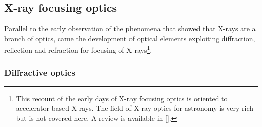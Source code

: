 \begin{refsection}
\subsection{X-ray focusing optics}\label{sec:focusing}

Parallel to the early observation of the phenomena that showed that X-rays are a branch of optics, came the development of optical elements exploiting diffraction, reflection and refraction for focusing of X-rays\footnote{This recount of the early days of X-ray focusing optics is oriented to accelerator-based X-rays. The field of X-ray optics for astronomy is very rich but is not covered here. A review is available in [\cite{Gorenstein2010}].}.

\subsubsection*{Diffractive optics}


\end{refsection}
